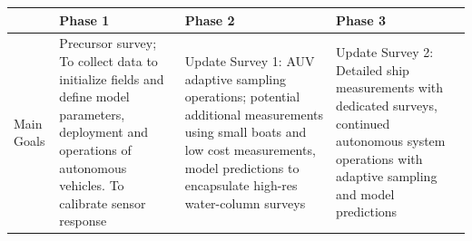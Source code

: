 \begin{table}[!t]
  \centering
  \footnotesize{
  \begin{tabular}{|p{4cm}|p{4cm}|p{4cm}|p{4cm}|}\hline 
    \rowcolor{Gray}
    \bfseries  &\bfseries Phase 1 &\bfseries Phase 2 &\bfseries Phase 3 \\
    \hline
    Main Goals& Precursor survey; To collect data to
                initialize fields and define model parameters,
                deployment and operations of autonomous vehicles. To
                calibrate sensor response& Update Survey 1: 
                                           AUV adaptive
                                           sampling operations;
                                           potential additional
                                           measurements using small boats
                                           and low cost measurements,
                                           model predictions to encapsulate
                                           high-res water-column surveys& Update Survey 2:
                                                                             Detailed
                                                                             ship
                                                                             measurements
                                                                             with
                                                                             dedicated
                                                                             surveys,
                                                                             continued
                                                                             autonomous system
                                                                             operations
                                                                             with
                                                                             adaptive
                                                                             sampling
                                                                             and
                                                                             model
                                                                             predictions\\
    \hline

\end{tabular}}
\end{table}
